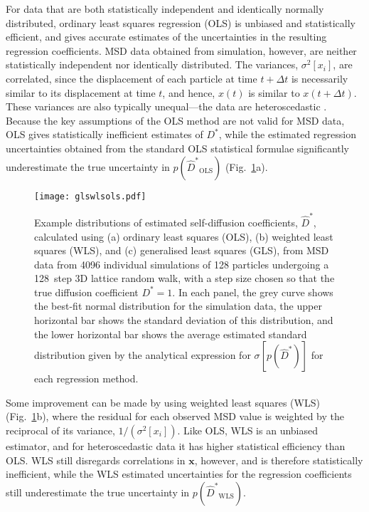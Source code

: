 \documentclass[reprint,superscriptaddress,nobibnotes,amsmath,amssymb,aps,prx,hidelinks,linenumbers]{revtex4-2}
\newcommand{\oMSD}{\ensuremath{\bm{x}}}
\newcommand{\oMSDs}[1]{\ensuremath{x}(#1)}
\newcommand{\oMSDi}{\ensuremath{x_i}}
\newcommand{\prob}[1]{\ensuremath{p(#1)}}
\newcommand{\Dest}{\ensuremath{\widehat{D}^*}}
\newcommand{\D}{\ensuremath{D^*}}
\newcommand{\var}[1]{\ensuremath{\sigma^2[#1]}}
\begin{document}
For data that are both statistically independent and identically normally distributed, ordinary least squares regression (OLS) is unbiased and statistically efficient, and gives accurate estimates of the uncertainties in the resulting regression coefficients.
MSD data obtained from simulation, however, are neither statistically independent nor identically distributed.
The variances, $\var{\oMSDi}$, are correlated, since the displacement of each particle at time $t+\Delta t$ is necessarily similar to its displacement at time $t$, and hence, $\oMSDs{t}$ is similar to $\oMSDs{t+\Delta t}$.
These variances are also typically unequal---the data are heteroscedastic \cite{smith_random_1996,he_statistical_2018,UslerEtAl_JComputChem2023}. 
Because the key assumptions of the OLS method are not valid for MSD data, OLS gives statistically inefficient estimates of $\D$, while the estimated regression uncertainties obtained from the standard OLS statistical formulae significantly underestimate the true uncertainty in $\prob{\Dest_\mathrm{OLS}}$ (Fig.~\ref{fig:glswlsols}a).

\begin{figure}
    \centering
    \texttt{[image: glswlsols.pdf]}
    \caption{
        Example distributions of estimated self-diffusion coefficients, $\Dest$, calculated using (a) ordinary least squares (OLS), (b) weighted least squares (WLS), and (c) generalised least squares (GLS),
        from MSD data from \num{4096} individual simulations of \num{128} particles undergoing a \SI{128}{step} 3D lattice random walk, with a step size chosen so that the true diffusion coefficient $\D = 1$.
        In each panel, the grey curve shows the best-fit normal distribution for the simulation data, the upper horizontal bar shows the standard deviation of this distribution, and the lower horizontal bar shows the average estimated standard distribution given by the analytical expression for $\sigma[\prob{\Dest}]$ for each regression method.}
    \label{fig:glswlsols}
\end{figure}

Some improvement can be made by using weighted least squares (WLS) (Fig.~\ref{fig:glswlsols}b), where the residual for each observed MSD value is weighted by the reciprocal of its variance, $1/(\var{\oMSDi})$.
Like OLS, WLS is an unbiased estimator, and for heteroscedastic data it has higher statistical efficiency than OLS.
WLS still disregards correlations in $\oMSD$, however, and is therefore statistically inefficient, while the WLS estimated uncertainties for the regression coefficients still underestimate the true uncertainty in $\prob{\Dest_\mathrm{WLS}}$.
\end{document}
